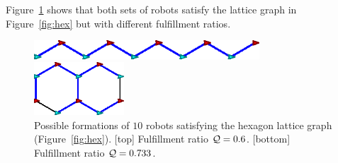 Figure~\ref{fig:hex-qual} shows that both sets of robots satisfy the lattice
graph in Figure~\ref{fig:hex} but with different fulfillment ratios.
\begin{figure}  
    \centering
    \begin{minipage}[b]{0.95\linewidth}
        \centering
        \includegraphics[width=0.75\textwidth]{figs/bad-hexagon}
    \end{minipage}
    \begin{minipage}[b]{0.95\linewidth}
        \centering
        \includegraphics[width=0.3\textwidth]{figs/good-hexagon}
    \end{minipage}
    \caption{Possible formations of $10$ robots satisfying the hexagon lattice graph (Figure~\ref{fig:hex}). 
    [top] Fulfillment ratio $\mathcal{Q}=0.6$. 
    [bottom] Fulfillment ratio $\mathcal{Q} = 0.733$.}
    \label{fig:hex-qual}
\end{figure}

